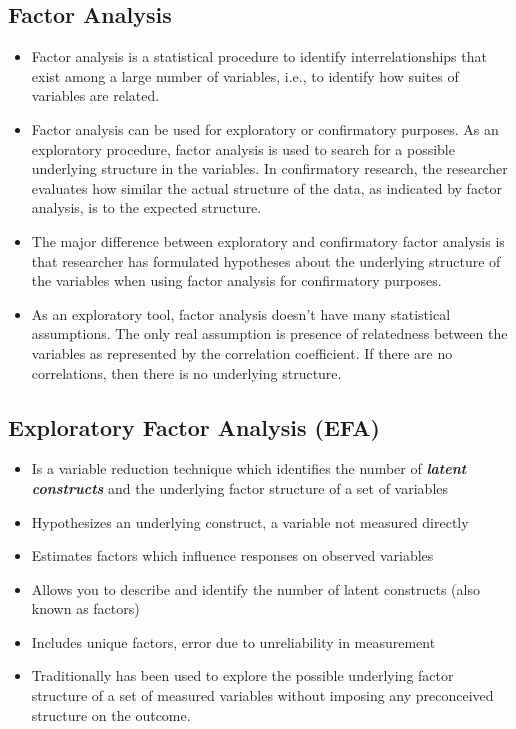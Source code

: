 \subsection{Factor Analysis}
\begin{itemize}
	\item Factor analysis is a statistical procedure to identify interrelationships that
	exist among a large number of variables, i.e.,  to identify how suites of
	variables are related.
	
		\item Factor analysis can be used for exploratory or confirmatory purposes.
	As an exploratory procedure, factor analysis is used to search for a
	possible underlying structure in the variables. In confirmatory research,
	the researcher evaluates how similar the actual structure of the data, as
	indicated by factor analysis, is to the expected structure.
	
		\item The major difference between exploratory and confirmatory factor
	analysis is that researcher has formulated hypotheses about the
	underlying structure of the variables when using factor analysis for
	confirmatory purposes.
	
		\item As an exploratory tool, factor analysis doesn't have many statistical
	assumptions. The only real assumption is presence of relatedness
	between the variables as represented by the correlation coefficient. If
	there are no correlations, then there is no underlying structure.
\end{itemize}


\subsection{Exploratory Factor Analysis (EFA)}
\begin{itemize}
\item Is a variable reduction technique which identifies the number of \textbf{\emph{latent constructs}} and the underlying factor
structure of a set of variables
\item Hypothesizes an underlying construct, a variable not measured directly
\item Estimates factors which influence responses on observed variables
\item Allows you to describe and identify the number of latent constructs (also known as factors)
\item Includes unique factors, error due to unreliability in measurement
\item Traditionally has been used to explore the possible underlying factor structure of a set of measured variables without imposing any preconceived structure on the outcome.
\end{itemize}

